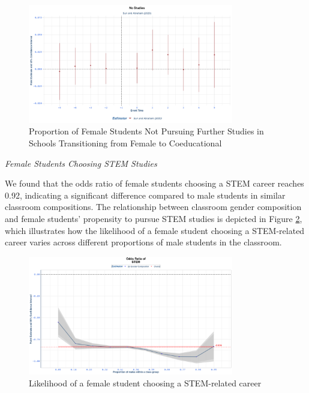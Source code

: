 \begin{figure}[H]
    \centering
        \includegraphics[width=0.8\textwidth]{Graph/Results/stagered_ex_females_NO_STUDIES.png}
        \caption{Proportion of Female Students Not Pursuing Further Studies in Schools Transitioning from Female to Coeducational}
    \label{fig:staggered_females_no_studies}
\end{figure}

\vspace{5mm}
\textit{Female Students Choosing STEM Studies}
\vspace{5mm}


We found that the odds ratio of female students choosing a STEM career reaches 0.92, indicating a significant difference compared to male students in similar classroom compositions. The relationship between classroom gender composition and female students' propensity to pursue STEM studies is depicted in Figure \ref{fig:STEM_studies}, which illustrates how the likelihood of a female student choosing a STEM-related career varies across different proportions of male students in the classroom.

\begin{figure}[H]
\centering
\includegraphics[width=0.8\textwidth]{Graph/Results/fe_panel_student_gender_composition_wome_in_STEM_bce.png}
\caption{Likelihood of a female student choosing a STEM-related career}
\label{fig:STEM_studies}
\end{figure}

